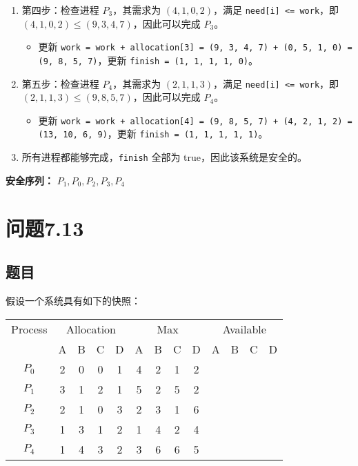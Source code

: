 \documentclass{article}
\begin{document}
\begin{enumerate}
\begin{enumerate}
		\item 第四步：检查进程 $P_3$，其需求为 $(4, 1, 0, 2)$，满足 \texttt{need[i] <= work}，即 $(4, 1, 0, 2) \leq (9, 3, 4, 7)$，因此可以完成 $P_3$。
		\begin{itemize}
			\item 更新 \texttt{work = work + allocation[3] = (9, 3, 4, 7) + (0, 5, 1, 0) = (9, 8, 5, 7)}，更新 \texttt{finish = (1, 1, 1, 1, 0)}。
		\end{itemize}
		
		\item 第五步：检查进程 $P_4$，其需求为 $(2, 1, 1, 3)$，满足 \texttt{need[i] <= work}，即 $(2, 1, 1, 3) \leq (9, 8, 5, 7)$，因此可以完成 $P_4$。
		\begin{itemize}
			\item 更新 \texttt{work = work + allocation[4] = (9, 8, 5, 7) + (4, 2, 1, 2) = (13, 10, 6, 9)}，更新 \texttt{finish = (1, 1, 1, 1, 1)}。
		\end{itemize}
		
		\item 
		所有进程都能够完成，\texttt{finish} 全部为 true，因此该系统是安全的。
	\end{enumerate}
	
	\textbf{安全序列：} $P_1, P_0, P_2, P_3, P_4$
\end{enumerate}

\section{问题7.13}

\subsection{题目}

假设一个系统具有如下的快照：

\begin{center}
	\begin{tabular}{|c|c|c|c|c|c|c|c|c|c|c|c|c|}
		\hline
		Process & \multicolumn{4}{|c|}{Allocation} & \multicolumn{4}{|c|}{Max} & \multicolumn{4}{|c|}{Available} \\
		\cline{2-13}
		& A & B & C & D & A & B & C & D & A & B & C & D \\
		\hline
		$P_0$      & 2 & 0 & 0 & 1 & 4 & 2 & 1 & 2 & & & & \\
		\hline
		$P_1$      & 3 & 1 & 2 & 1 & 5 & 2 & 5 & 2 & & & & \\
		\hline
		$P_2$      & 2 & 1 & 0 & 3 & 2 & 3 & 1 & 6 & & & & \\
		\hline
		$P_3$      & 1 & 3 & 1 & 2 & 1 & 4 & 2 & 4 & & & & \\
		\hline
		$P_4$      & 1 & 4 & 3 & 2 & 3 & 6 & 6 & 5 & & & & \\
		\hline
	\end{tabular}
\end{center}
\end{document}
